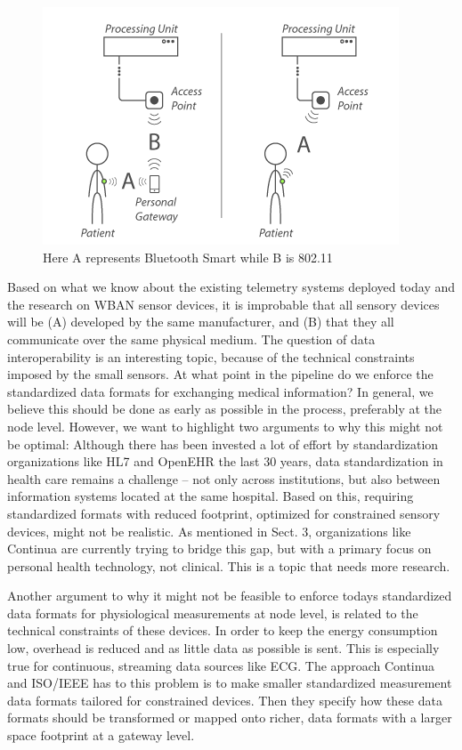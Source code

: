 \begin{figure}[H]
\centering
\includegraphics[scale=0.75]{img/figures/architecture.png}
\caption{Here A represents Bluetooth Smart while B is 802.11}
\label{fig:architecture}
\end{figure}

\noindent
Based on what we know about the existing telemetry systems deployed today and the research on WBAN sensor devices, it is improbable that all sensory devices will be (A) developed by the same manufacturer, and (B) that they all communicate over the same physical medium. The question of data interoperability is an interesting topic, because of the technical constraints imposed by the small sensors. At what point in the pipeline do we enforce the standardized data formats for exchanging medical information? In general, we believe this should be done as early as possible in the process, preferably at the node level. However, we want to highlight two arguments to why this might not be optimal: Although there has been invested a lot of effort by standardization organizations like HL7 and OpenEHR the last 30 years, data standardization in health care remains a challenge -- not only across institutions, but also between information systems located at the same hospital. Based on this, requiring standardized formats with reduced footprint, optimized for constrained sensory devices, might not be realistic. As mentioned in Sect. 3, organizations like Continua are currently trying to bridge this gap, but with a primary focus on personal health technology, not clinical. This is a topic that needs more research.

Another argument to why it might not be feasible to enforce todays standardized data formats for physiological measurements at node level, is related to the technical constraints of these devices. In order to keep the energy consumption low, overhead is reduced and as little data as possible is sent. This is especially true for continuous, streaming data sources like ECG. The approach Continua and ISO/IEEE has to this problem is to make smaller standardized measurement data formats tailored for constrained devices. Then they specify how these data formats should be transformed or mapped onto richer, data formats with a larger space footprint at a gateway level.

